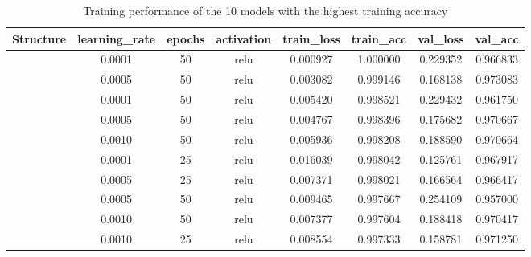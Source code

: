 \documentclass[a4paper]{article}
\begin{document}
\begin{table}[ht]
    \centering
    \caption{Training performance of the 10 models with the highest training accuracy}
    \label{tab:ann_performance_top10_training_accuracy}
    \begin{tabular}{|| c c c c | c c c c ||}
  
    \hline
    \centering
    \textbf{Structure}  &\textbf{learning\_rate} &\textbf{epochs}    &\textbf{activation}    & \textbf{train\_loss}   &\textbf{train\_acc} &\textbf{val\_loss}  &\textbf{val\_acc} \\
    \hline \hline
    [64,32]             & 0.0001                & 50                & relu                  & 0.000927              & 1.000000          &0.229352           & 0.966833 \\ 
    \hline
    [64,32,16]          & 0.0005                & 50                & relu                  & 0.003082              & 0.999146          &0.168138           & 0.973083 \\ 
    \hline
    [64,32,16]          & 0.0001                & 50                & relu                  & 0.005420              & 0.998521          &0.229432           & 0.961750 \\ 
    \hline
    [64,32]             & 0.0005                & 50                & relu                  & 0.004767              & 0.998396          &0.175682           & 0.970667 \\ 
    \hline
    [64,32]             & 0.0010                & 50                & relu                  & 0.005936              & 0.998208          &0.188590           & 0.970664 \\ 
    \hline
    [64,32]             & 0.0001                & 25                & relu                  & 0.016039              & 0.998042          &0.125761           & 0.967917 \\ 
    \hline
    [64,32]             & 0.0005                & 25                & relu                  & 0.007371              & 0.998021          &0.166564           & 0.966417 \\ 
    \hline
    [32,16]             & 0.0005                & 50                & relu                  & 0.009465              & 0.997667          &0.254109           & 0.957000 \\ 
    \hline
    [64,32,16]          & 0.0010                & 50                & relu                  & 0.007377              & 0.997604          &0.188418           & 0.970417 \\ 
    \hline
    [64,32]             & 0.0010                & 25                & relu                  & 0.008554              & 0.997333          &0.158781           & 0.971250 \\ 
    \hline
    \end{tabular}
\end{table}
\end{document}
